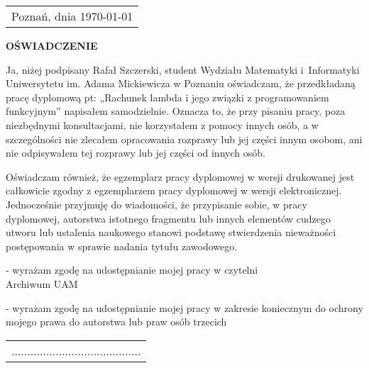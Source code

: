 \null\hfill\begin{tabular}[t]{l@{}}
  Poznań, dnia \today
\end{tabular}

\vspace{1.5cm}

\begin{center}
\large\textbf{OŚWIADCZENIE}
\end{center}

\vspace{1.5cm}

Ja, niżej podpisany Rafał Szczerski, student Wydziału
Matematyki i~Informatyki Uniwersytetu im. Adama Mickiewicza
w
Poznaniu
oświadczam,
że
przedkładaną
pracę
dyplomową
pt:
„Rachunek lambda i jego związki z programowaniem funkcyjnym”
napisałem samodzielnie.
Oznacza to, że przy pisaniu pracy, poza niezbędnymi konsultacjami, nie korzystałem
z pomocy innych osób, a w szczególności nie zlecałem opracowania rozprawy lub jej
części innym osobom, ani nie odpisywałem tej rozprawy lub jej części od innych
osób.

Oświadczam również, że egzemplarz pracy dyplomowej w wersji drukowanej jest
całkowicie zgodny z egzemplarzem pracy dyplomowej w wersji elektronicznej.
Jednocześnie przyjmuję do wiadomości, że przypisanie sobie, w pracy dyplomowej,
autorstwa istotnego fragmentu lub innych elementów cudzego utworu lub ustalenia
naukowego stanowi podstawę stwierdzenia nieważności postępowania w sprawie
nadania tytułu zawodowego.

\vspace{1.5cm}

\noindent [TAK] - wyrażam zgodę na udostępnianie mojej pracy w czytelni\\ Archiwum UAM 

\noindent [TAK] - wyrażam zgodę na udostępnianie mojej pracy w zakresie koniecznym do ochrony
mojego prawa do autorstwa lub praw osób trzecich

\vspace{1cm}

\null\hfill\begin{tabular}[t]{l@{}}
  .........................................
\end{tabular}
